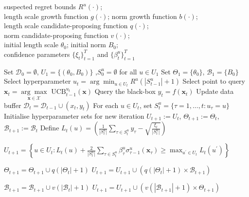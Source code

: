 \documentclass{article}
\theoremstyle{plain}
\theoremstyle{definition}
\theoremstyle{remark}
\theoremstyle{plain}
\begin{document}
\begin{algorithm}
\caption{Length scale and Norm Balancing GP-UCB (LNB-GP-UCB) }\label{alg:lnb_bo}
\begin{algorithmic}[1]
\REQUIRE  suspected regret bounds $R^u(\cdot)$; \\ length scale growth function $g(\cdot)$; norm growth function $b(\cdot)$;\\
length scale candidate-proposing function $q(\cdot)$; \\
norm candidate-proposing function $v(\cdot)$;\\
initial length scale $\theta_0$; initial norm $B_0$; \\
confidence parameters $\{\xi_t\}_{t=1}^T$ and
$\{\beta^u_t\}_{t=1}^T$ 

\STATE Set $\mathcal{D}_{0} = \emptyset$, $U_1 = \{(\theta_0, B_0)\}$ ,$S^u_0 = \emptyset$ for all $u \in U_1$
\STATE Set $\Theta_1 = \{\theta_0\}$, $\mathcal{B}_1 = \{B_0\}$
\STATE Select hyperparameter  $u_t = \arg\min_{u \in U_t} R^u(|S_{t-1}^{u}| + 1)$
\STATE Select point to query $\bm{x}_t =  \underset{\bm{x} \in \mathcal{X}}{\arg\max} \textrm{ UCB}_{t-1}^{u_t}(\bm{x})$
\STATE Query the black-box $y_t = f(\bm{x}_t)$ 
\STATE Update data buffer $\mathcal{D}_t = \mathcal{D}_{t-1} \cup (x_t, y_t)$
\STATE For each $u \in U_{t}$, set $S_t^{u} = \{\tau  = 1,\dots, t: u_{\tau} = u\}$
\STATE Initialise hyperparameter sets for new iteration $U_{t+1} := U_{t}$, $\Theta_{t+1} := \Theta_{t}$, $\mathcal{B}_{t+1} := \mathcal{B}_{t}$
\STATE Define $L_t(u) = \left( \frac{1}{|S_t^{u}|} \sum_{\tau \in S_t^{u}}y_{\tau} - \sqrt{\frac{\xi_{t}}{|S_{t}^{u}|}} \right)$

\STATE $U_{t+1} = \left\{ u \in U_t: L_t(u) +  \frac{2}{|S_t^{u}|} \sum_{\tau \in S_t^u} \beta_\tau^u \sigma^u_{\tau-1}(\bm{x}_\tau)  \ge  \max_{u^\prime \in U_{t}} L_t(u^\prime) \right\}$

\ENDIF

\STATE $\Theta_{t+1} = \Theta_{t+1} \cup q(|\Theta_t| + 1)$
\STATE $U_{t+1} = U_{t+1} \cup (q(|\Theta_t| + 1) \times \mathcal{B}_{t+1})$
\ENDIF

\STATE $\mathcal{B}_{t+1} = \mathcal{B}_{t+1} \cup v(|\mathcal{B}_t| + 1)$
\STATE $U_{t+1} = U_{t+1} \cup (v(|\mathcal{B}_{t+1}| + 1) \times \Theta_{t+1})$
\ENDIF

\ENDFOR

\end{algorithmic}
\end{algorithm}
\end{document}
